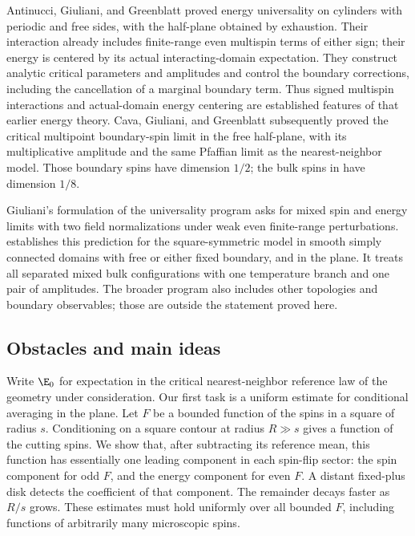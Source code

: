 Antinucci, Giuliani, and Greenblatt \cite[Theorem~1.1 and Corollary~1.2]{AGG2023} proved energy
universality on cylinders with periodic and free sides, with the
half-plane obtained by exhaustion. Their interaction already includes
finite-range even multispin terms of either sign; their energy is
centered by its actual interacting-domain expectation. They construct
analytic critical parameters and amplitudes and control the boundary
corrections, including the cancellation of a marginal boundary term.
Thus signed multispin interactions and actual-domain energy centering
are established features of that earlier energy theory. Cava,
Giuliani, and Greenblatt \cite[Theorem~1.1]{CGG2025} subsequently proved the
critical multipoint boundary-spin limit in the free half-plane, with
its multiplicative amplitude and the same Pfaffian limit as the
nearest-neighbor model.
Those boundary spins have dimension $1/2$; the bulk spins in
 have dimension $1/8$.

Giuliani's formulation of the universality program
\cite[Section~2 and Open Problems~1--2]{GiulianiICM2022} asks for
mixed spin and energy limits with two field normalizations under weak
even finite-range perturbations.  establishes this
prediction for the square-symmetric model in smooth simply connected
domains with free or either fixed boundary, and in the plane. It treats
all separated mixed bulk configurations with one temperature branch
and one pair of amplitudes. The broader program also includes other
topologies and boundary observables; those are outside the statement
proved here.

\subsection{Obstacles and main ideas}

Write $\E_0$ for expectation in the critical nearest-neighbor reference
law of the geometry under consideration. Our first task is a uniform
estimate for conditional averaging in the plane. Let $F$ be a bounded function
of the spins in a square of radius $s$. Conditioning on a square contour
at radius $R\gg s$ gives a function of the cutting spins. We show that,
after subtracting its reference mean, this function has essentially one
leading component in each spin-flip sector: the spin component for odd
$F$, and the energy component for even $F$. A distant fixed-plus disk
detects the coefficient of that component. The remainder decays faster
as $R/s$ grows. These estimates must hold uniformly over all bounded
$F$, including functions of arbitrarily many microscopic spins.

